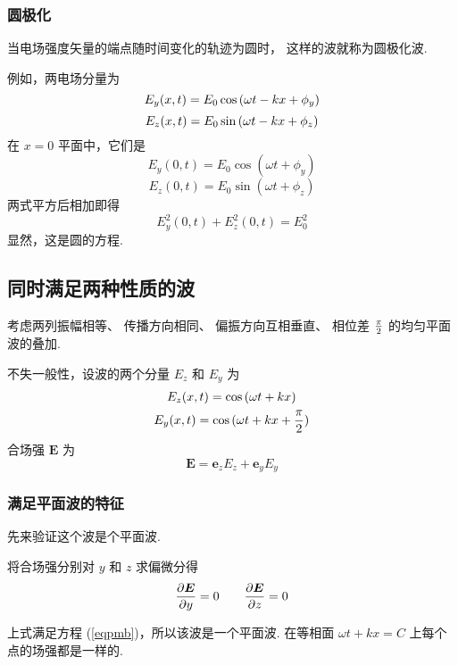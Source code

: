 \documentclass[UTF8,linespread=1.236]{ctexart}
\newcommand\myref[1]{(\ref{#1})}
\newcommand\cu[1]{\boldsymbol{#1}}
\newcommand\vecE{\cu{E}}
\newcommand\pypx[2]{{{\partial {#1}} \over {\partial {#2}}}}
\begin{document}
\subsubsection{圆极化}

当电场强度矢量的端点随时间变化的轨迹为圆时，
这样的波就称为圆极化波.

例如，两电场分量为
\begin{equation}
    E_y(x,t) = E_0\cos{(\omega t - kx + \phi_{y})}
\end{equation}
\begin{equation}
    E_z(x,t) = E_0\sin{(\omega t - kx + \phi_{z})}
\end{equation}
在 $x = 0$ 平面中，它们是
\begin{equation}
    E_y(0,t) = E_0\cos{(\omega t + \phi_y)}
\end{equation}
\begin{equation}
    E_z(0,t) = E_0\sin{(\omega t + \phi_z)}
\end{equation}
两式平方后相加即得
\begin{equation}
    E_y^2(0,t) + E_z^2(0,t) = E_0^2
\end{equation}
显然，这是圆的方程.

\subsection{同时满足两种性质的波}

考虑两列振幅相等、
传播方向相同、
偏振方向互相垂直、
相位差 $\pi \over 2$ 的均匀平面波的叠加.

不失一般性，设波的两个分量 $E_z$ 和 $E_y$ 为
\begin{gather}
    E_z(x,t) = \cos{(\omega t + kx)} \\
    E_y(x,t) = \cos{(\omega t + kx + {\pi \over 2})}
\end{gather}
合场强 $\vecE$ 为
\begin{equation}
    \vecE = \cu{e}_zE_z + \cu{e}_yE_y
\end{equation}

\subsubsection{满足平面波的特征}
先来验证这个波是个平面波.

将合场强分别对 $y$ 和 $z$ 求偏微分得
\begin{equation}
    \pypx{\vecE}{y} = 0 \qquad \pypx{\vecE}{z} = 0
\end{equation}

上式满足方程 \myref{eqpmb}，所以该波是一个平面波.
在等相面 $\omega t + kx = C$ 上每个点的场强都是一样的.
\end{document}
